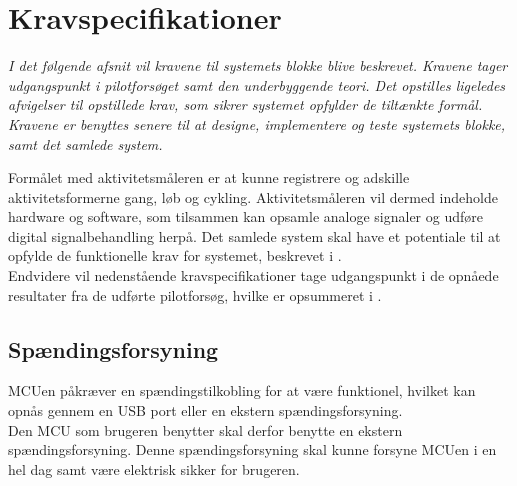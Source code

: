 \section{Kravspecifikationer}\label{Sec:krav}
\textit{I det følgende afsnit vil kravene til systemets blokke blive beskrevet. Kravene tager udgangspunkt i pilotforsøget samt den underbyggende teori. Det opstilles ligeledes afvigelser til opstillede krav, som sikrer systemet opfylder de tiltænkte formål. Kravene er benyttes senere til at designe, implementere og teste systemets blokke, samt det samlede system.}

Formålet med aktivitetsmåleren er at kunne registrere og adskille aktivitetsformerne gang, løb og cykling. Aktivitetsmåleren vil dermed indeholde hardware og software, som tilsammen kan opsamle analoge signaler og udføre digital signalbehandling herpå. Det samlede system skal have et potentiale til at opfylde de funktionelle krav for systemet, beskrevet i . \\
Endvidere vil nedenstående kravspecifikationer tage udgangspunkt i de opnåede resultater fra de udførte pilotforsøg, hvilke er opsummeret i .
%

\subsection{Spændingsforsyning} \label{krav_spaendingsf}
MCUen påkræver en spændingstilkobling for at være funktionel, hvilket kan opnås gennem en USB port eller en ekstern spændingsforsyning.\\
Den MCU som brugeren benytter skal derfor benytte en ekstern spændingsforsyning. Denne spændingsforsyning skal kunne forsyne MCUen i en hel dag samt være elektrisk sikker for brugeren. %

